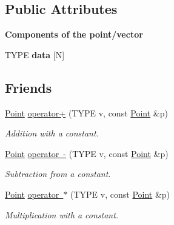 \subsection*{Public Attributes}
\begin{Indent}\textbf{ Components of the point/vector}\par
\begin{DoxyCompactItemize}
\item 
\mbox{\label{classcy_1_1_point_a76060ee220bdaeeec974155891ac8983}} 
T\+Y\+PE {\bfseries data} \mbox{[}N\mbox{]}
\end{DoxyCompactItemize}
\end{Indent}
\subsection*{Friends}
\begin{DoxyCompactItemize}
\item 
\mbox{\label{classcy_1_1_point_a54a185aa38570eb05f5409715b6cf43c}} 
\mbox{\hyperlink{classcy_1_1_point}{Point}} \mbox{\hyperlink{classcy_1_1_point_a54a185aa38570eb05f5409715b6cf43c}{operator+}} (T\+Y\+PE v, const \mbox{\hyperlink{classcy_1_1_point}{Point}} \&p)
\begin{DoxyCompactList}\small\item\em Addition with a constant. \end{DoxyCompactList}\item 
\mbox{\label{classcy_1_1_point_a4e1f9bbcbc7d73e57cd92e14256b9f5d}} 
\mbox{\hyperlink{classcy_1_1_point}{Point}} \mbox{\hyperlink{classcy_1_1_point_a4e1f9bbcbc7d73e57cd92e14256b9f5d}{operator -\/}} (T\+Y\+PE v, const \mbox{\hyperlink{classcy_1_1_point}{Point}} \&p)
\begin{DoxyCompactList}\small\item\em Subtraction from a constant. \end{DoxyCompactList}\item 
\mbox{\label{classcy_1_1_point_aa2494709550f76f45273d8ec87c89e63}} 
\mbox{\hyperlink{classcy_1_1_point}{Point}} \mbox{\hyperlink{classcy_1_1_point_aa2494709550f76f45273d8ec87c89e63}{operator $\ast$}} (T\+Y\+PE v, const \mbox{\hyperlink{classcy_1_1_point}{Point}} \&p)
\begin{DoxyCompactList}\small\item\em Multiplication with a constant. \end{DoxyCompactList}\end{DoxyCompactItemize}


